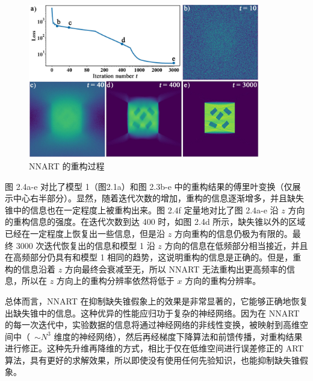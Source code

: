 \begin{figure}[htbp]
	\vspace{\baselineskip}
	\centering
	\includegraphics[width=0.9\textwidth]{../3.3/33}
	\caption{NNART 的重构过程}\label{fig:33}
	\song{}
\end{figure}

图 2.4a-e 对比了模型 1（图2.1a）和图 2.3b-e 中的重构结果的傅里叶变换（仅展示中心右半部分）。显然，随着迭代次数的增加，重构的信息逐渐增多，并且缺失锥中的信息也在一定程度上被重构出来。图 2.4f 定量地对比了图 2.4a-e 沿 $z$ 方向的重构信息的强度。在迭代次数到达 400 时，如图 2.4d 所示，缺失锥以外的区域已经在一定程度上恢复出一些信息，但是沿 $z$ 方向重构的信息仍极为有限的。最终 3000 次迭代恢复出的信息和模型 1 沿 $z$ 方向的信息在低频部分相当接近，并且在高频部分仍具有和模型 1 相同的趋势，这说明重构的信息是正确的。但是，重构的信息沿着 $z$ 方向最终会衰减至无，所以 NNART 无法重构出更高频率的信息，所以在 $z$ 方向上的重构分辨率依然将低于 $x$ 方向的重构分辨率。

总体而言，NNART 在抑制缺失锥假象上的效果是非常显著的，它能够正确地恢复出缺失锥中的信息。这种优异的性能应归功于复杂的神经网络。因为在 NNART 的每一次迭代中，实验数据的信息将通过神经网络的非线性变换，被映射到高维空间中（~$\sim N^3$ 维度的神经网络），然后再经梯度下降算法和前馈传播，对重构结果进行修正。这种先升维再降维的方式，相比于仅在低维空间进行误差修正的 ART 算法，具有更好的求解效果，所以即使没有使用任何先验知识，也能抑制缺失锥假象。

